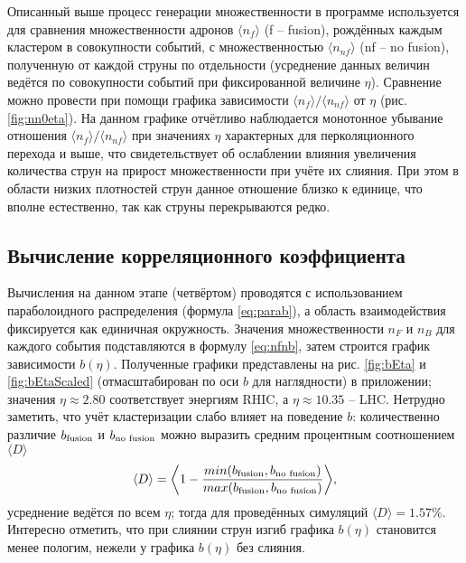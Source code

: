 Описанный выше процесс генерации множественности в программе используется для сравнения множественности адронов $\langle n_{f} \rangle$ (f -- fusion), рождённых каждым кластером в совокупности событий, с множественностью $\langle n_{nf} \rangle$ (nf -- no fusion), полученную от каждой струны по отдельности (усреднение данных величин ведётся по совокупности событий при фиксированной величине $\eta$). 
Сравнение можно провести при помощи графика зависимости $\langle n_{f} \rangle / \langle n_{nf} \rangle$ от $\eta$ (рис. \ref{fig:nn0eta}). 
На данном графике отчётливо наблюдается монотонное убывание отношения $\langle n_{f} \rangle / \langle n_{nf} \rangle$ при значениях $\eta$ характерных для перколяционного перехода и выше, что свидетельствует об ослаблении влияния увеличения количества струн на прирост множественности при учёте их слияния. При этом в области низких плотностей струн данное отношение близко к единице, что вполне естественно, так как струны перекрываются редко.
\subsection{Вычисление корреляционного коэффициента}
Вычисления на данном этапе (четвёртом) проводятся с использованием параболоидного распределения (формула \ref{eq:parab}), а область взаимодействия фиксируется как единичная окружность. 
Значения множественности $n_F$ и $n_B$ для каждого события подставляются в формулу \ref{eq:nfnb}, затем строится график зависимости $b(\eta)$. 
Полученные графики представлены на рис. \ref{fig:bEta} и \ref{fig:bEtaScaled} (отмасштабирован по оси $b$ для наглядности) в приложении; значения $\eta \approx 2.80$ соответствует энергиям RHIC, а $\eta \approx 10.35$ -- LHC. 
Нетрудно заметить, что учёт кластеризации слабо влияет на поведение $b$: количественно различие $b_{\textnormal{fusion}}$ и $b_{\textnormal{no fusion}}$ можно выразить средним процентным соотношением $\langle D \rangle$ 
\begin{equation} \label{eq:bfbn}
	\langle D \rangle = \bigg \langle 1 - \frac{min(b_{\textnormal{fusion}}, b_{\textnormal{no fusion}})}{max(b_{\textnormal{fusion}}, b_{\textnormal{no fusion}})} \bigg \rangle,
\end{equation}
усреднение ведётся по всем $\eta$; тогда для проведённых симуляций $\langle D \rangle = 1.57 \%$. Интересно отметить, что при слиянии струн изгиб графика $b(\eta)$ становится менее пологим, нежели у графика $b(\eta)$ без слияния.

